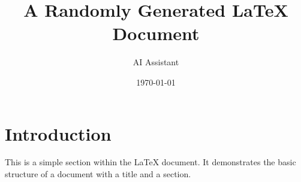 \documentclass{article}
\title{A Randomly Generated LaTeX Document}
\author{AI Assistant}
\date{\today}
\begin{document}
\maketitle

\section{Introduction}
This is a simple section within the LaTeX document. It demonstrates the basic structure of a document with a title and a section.
\end{document}
